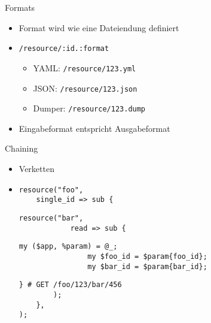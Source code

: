 \documentclass[aspectratio=1610]{beamer}
\begin{document}
\begin{frame}{Formats}

    \begin{itemize}
        \item Format wird wie eine Dateiendung definiert
        \pause
        \item \texttt{/resource/:id.:format}
        \pause
        \begin{itemize}
            \item YAML: \texttt{/resource/123.yml}
            \pause
            \item JSON: \texttt{/resource/123.json}
            \pause
            \item Dumper: \texttt{/resource/123.dump}
            \pause
        \end{itemize}
        \item Eingabeformat entspricht Ausgabeformat
    \end{itemize}

\end{frame}


\begin{frame}[fragile]{Chaining}

\begin{itemize}
\item Verketten
\pause
\item[]
\begin{lstlisting}
resource("foo",
    single_id => sub {
\end{lstlisting}\pause\begin{lstlisting}[firstnumber=last]
        resource("bar",
            read => sub {
\end{lstlisting}\pause\begin{lstlisting}[firstnumber=last]
                my ($app, %param) = @_;
                my $foo_id = $param{foo_id};
                my $bar_id = $param{bar_id};
\end{lstlisting}\pause\begin{lstlisting}[firstnumber=last]
            } # GET /foo/123/bar/456
        );
    },
);
\end{lstlisting}
\end{itemize}
\end{frame}

\end{document}
